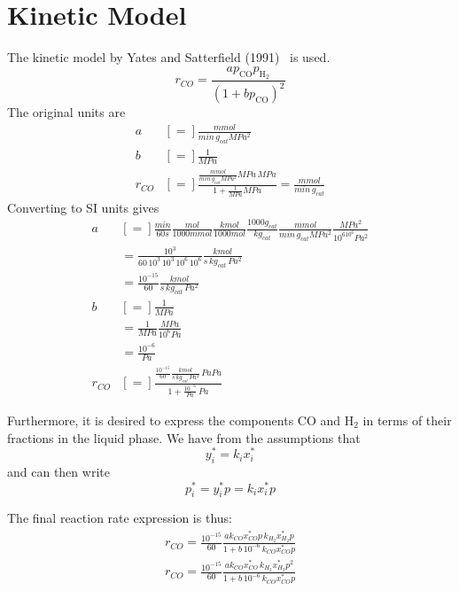 \documentclass{article}
\begin{document}
\section{Kinetic Model}
\label{sec:kinetic_model}
The kinetic model by Yates and Satterfield (1991)~\cite{Yates1991} is used. 
\begin{equation}
	r_{CO} = \frac{a p_{\mathrm{CO}}p_{\mathrm{H}_2}}  {\left(1+bp_{\mathrm{CO}} \right)^2}
\end{equation}
The original units are 
\begin{equation}
	\begin{split}
		a  	 	&[=] \frac{mmol}{min\,g_{cat}MPa^2}\\
		b 		&[=] \frac{1}{MPa}\\
		r_{CO} 	&[=] \frac{\frac{mmol}{min\,g_{cat}MPa^2} MPa\, MPa}{1 + \frac{1}{MPa} MPa}= \frac{mmol}{min\,g_{cat}} 
	\end{split}
\end{equation}
Converting to SI units gives
\begin{equation}
	\begin{split}
		a  	&[=] \frac{min}{60s}\frac{mol}{1000 mmol}\frac{kmol}{1000 mol}\frac{1000 g_{cat}}{kg_{cat}}\frac{mmol}{min\,g_{cat}MPa^2}\frac{MPa^2}{10^610^6Pa^2} \\
			& = \frac{10^{3}}{60\,10^3\,10^3\,10^6\,10^6}\frac{kmol}{s\,kg_{cat}\,Pa^2}\\
			& = \frac{10^{-15}}{60}\frac{kmol}{s\,kg_{cat}\,Pa^2}\\
		b 	&[=] \frac{1}{MPa}\\
			&= \frac{1}{MPa}\frac{MPa}{10^6Pa}\\
			&= \frac{10^{-6}}{Pa}\\
		r_{CO} &[=] \frac{\frac{10^{-15}}{60}\frac{kmol}{s\,kg_{cat}\,Pa^2}\,Pa Pa}{1+\frac{10^{-6}}{Pa}\,Pa} 
	\end{split}
\end{equation}

Furthermore, it is desired to express the components CO and H$_2$ in terms of their fractions in the liquid phase. We have from the assumptions that
\begin{equation}
	y_i^* = k_ix_i^*
\end{equation}
and can then write
\begin{equation}
	p_i^* = y_i^*p = k_ix_i^*p
\end{equation}

The final reaction rate expression is thus:
\begin{equation}
	\begin{split}
		r_{CO} = \frac{10^{-15}}{60} \frac{ak_{CO}x_{CO}^*p\,k_{H_2}x_{H_2}^*p}{1 + b\,10^{-6}\,k_{CO}x_{CO}^*p}\\
		r_{CO} = \frac{10^{-15}}{60} \frac{ak_{CO}x_{CO}^*\,k_{H_2}x_{H_2}^*p^2}{1 + b\,10^{-6}\,k_{CO}x_{CO}^*p}\\
	\end{split}
	\label{eq:final_reaction_rate_expression}
\end{equation}
\end{document}

